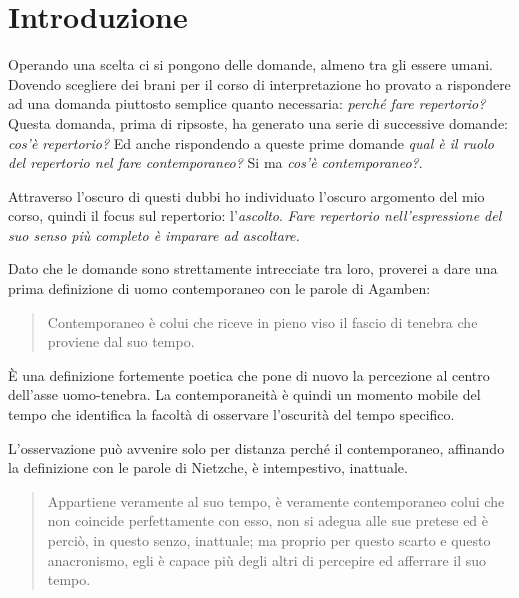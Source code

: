 

\chapter*{Introduzione}

Operando una scelta ci si pongono delle domande, almeno tra gli essere umani. Dovendo scegliere dei brani per il corso di interpretazione ho provato a rispondere ad una domanda piuttosto semplice quanto necessaria: \emph{perché fare repertorio?} Questa domanda, prima di ripsoste, ha generato una serie di successive domande: \emph{cos'è repertorio?} Ed anche rispondendo a queste prime domande \emph{qual è il ruolo del repertorio nel fare contemporaneo?} Si ma \emph{cos'è contemporaneo?}.

Attraverso l'oscuro di questi dubbi ho individuato l'oscuro argomento del mio corso, quindi il focus sul repertorio: l'\emph{ascolto}. \emph{Fare repertorio nell'espressione del suo senso pi\`u completo \`e imparare ad ascoltare.}
 
Dato che le domande sono strettamente intrecciate tra loro, proverei a dare una prima definizione di uomo contemporaneo con le parole di Agamben:

\begin{quote}
	Contemporaneo è colui che riceve in pieno viso il fascio di tenebra che proviene dal suo tempo.
\end{quote}

È una definizione fortemente poetica che pone di nuovo la percezione al centro dell'asse uomo-tenebra. La contemporaneità è quindi un momento mobile del tempo che identifica la facoltà di osservare l'oscurità del tempo specifico.

L'osservazione può avvenire solo per distanza perché il contemporaneo, affinando la definizione con le parole di Nietzche, è intempestivo, inattuale.

\begin{quote}
	Appartiene veramente al suo tempo, è veramente contemporaneo colui che non coincide perfettamente con esso, non si adegua alle sue pretese ed è perciò, in questo senzo, inattuale; ma proprio per questo scarto e questo anacronismo, egli è capace pi\`u degli altri di percepire ed afferrare il suo tempo.
\end{quote}

